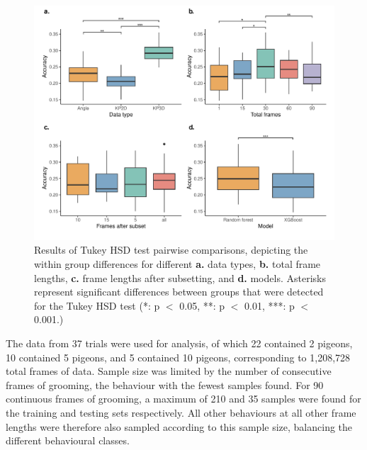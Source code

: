 \documentclass[11pt, letterpaper]{article} %
\begin{document}
\begin{table}[htbp]
\begin{tabular}{cccccccccccc}
    \label{results_table}
    \end{tabular}
\end{table}


\begin{figure}[htbp]
    \centering
    \includegraphics[width=1\linewidth]{results_boxplot_final.pdf}
    \caption{Results of Tukey HSD test pairwise comparisons, depicting the within group differences for different \textbf{a.} data types, \textbf{b.} total frame lengths, \textbf{c.} frame lengths after subsetting, and \textbf{d.} models. Asterisks represent significant differences between groups that were detected for the Tukey HSD test (*: p $<$ 0.05, **: p $<$ 0.01, ***: p $<$ 0.001.)}
    \label{fig:results_boxplot}
\end{figure}


    \noindent The data from 37 trials were used for analysis, of which 22 contained 2 pigeons, 10 contained 5 pigeons, and 5 contained 10 pigeons, corresponding to 1,208,728 total frames of data.
    Sample size was limited by the number of consecutive frames of grooming, the behaviour with the fewest samples found. For 90 continuous frames of grooming, a maximum of 210 and 35 samples were found for the training and testing sets respectively. All other behaviours at all other frame lengths were therefore also sampled according to this sample size, balancing the different behavioural classes. \\
    
    
\end{document}
